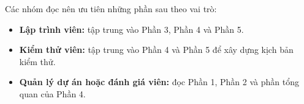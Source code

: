 \vspace{0.5cm}

\noindent Các nhóm đọc nên ưu tiên những phần sau theo vai trò:

\begin{itemize}
    \item \textbf{Lập trình viên:} tập trung vào Phần 3, Phần 4 và Phần 5.
    \item \textbf{Kiểm thử viên:} tập trung vào Phần 4 và Phần 5 để xây dựng kịch bản kiểm thử.
    \item \textbf{Quản lý dự án hoặc đánh giá viên:} đọc Phần 1, Phần 2 và phần tổng quan của Phần 4.
\end{itemize}
